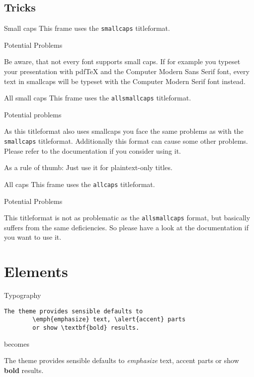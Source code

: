 \documentclass{beamer}
\renewenvironment{alertblock}[1]
{\begin{oldalertblock}{#1}
		\vspace{0pt}
	}
	{ 
	\end{oldalertblock}
}
\begin{document}
\subsection{Tricks}

{
	\begin{frame}{Small caps}
		This frame uses the \texttt{smallcaps} titleformat.
		
		\begin{alertblock}{Potential Problems}
			Be aware, that not every font supports small caps. If for example you typeset your presentation with pdfTeX and the Computer Modern Sans Serif font, every text in smallcaps will be typeset with the Computer Modern Serif font instead.
		\end{alertblock}
	\end{frame}
}

{
	\begin{frame}{All small caps}
		This frame uses the \texttt{allsmallcaps} titleformat.
		
		\begin{alertblock}{Potential problems}
			As this titleformat also uses smallcaps you face the same problems as with the \texttt{smallcaps} titleformat. Additionally this format can cause some other problems. Please refer to the documentation if you consider using it.
			
			As a rule of thumb: Just use it for plaintext-only titles.
		\end{alertblock}
	\end{frame}
}

{
	\begin{frame}{All caps}
		This frame uses the \texttt{allcaps} titleformat.
		
		\begin{alertblock}{Potential Problems}
			This titleformat is not as problematic as the \texttt{allsmallcaps} format, but basically suffers from the same deficiencies. So please have a look at the documentation if you want to use it.
		\end{alertblock}
	\end{frame}
}

\section{Elements}

\begin{frame}[fragile]{Typography}
	\begin{verbatim}The theme provides sensible defaults to
		\emph{emphasize} text, \alert{accent} parts
		or show \textbf{bold} results.\end{verbatim}
	
	\begin{center}becomes\end{center}
	
	The theme provides sensible defaults to \emph{emphasize} text,
	\alert{accent} parts or show \textbf{bold} results.
\end{frame}
\end{document}
